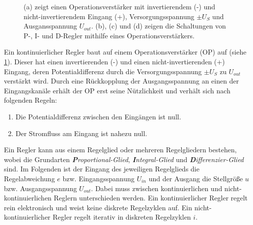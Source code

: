 \begin{figure}[h]
{{{	    	}
	}}
	\caption[Operationsverstärker, Regler]{(a) zeigt einen Operationsverstärker
	mit invertierendem (-) und nicht-invertierendem
	Eingang (+), Versorgungsspannung $\pm U_S$ und
	Ausgansspannung $U_{out}$. (b), (c) und (d) zeigen die Schaltungen von
	P-, I- und D-Regler mithilfe eines
	Operationsverstärkers.}
	\label{fig:operationsverstaerker}
\end{figure}
Ein kontinuierlicher Regler baut auf einem Operationsverstärker (OP) auf (siehe
\ref{fig:operationsverstaerker}). Dieser
hat einen invertierenden (-) und einen nicht-invertierenden (+) Eingang, deren Potentialdifferenz durch die
Versorgungsspannung $\pm U_S$ zu $U_{out}$ verstärkt wird. Durch eine
Rückkopplung der Ausgangsspannung an einen der Eingangskanäle erhält der OP erst
seine Nützlichkeit und verhält sich nach folgenden Regeln:
\begin{enumerate}
       \item Die Potentialdifferenz zwischen den Eingängen ist null.
       \item Der Stromfluss am Eingang ist nahezu null.
\end{enumerate}
Ein Regler kann aus einem Regelglied oder mehreren Regelgliedern bestehen, wobei
die Grundarten \textit{\textbf{P}roportional-Glied}, \textit{\textbf{I}ntegral-Glied} und
\textit{\textbf{D}ifferenzier-Glied} sind. Im Folgenden ist der Eingang des
jeweiligen Regelglieds die Regelabweichung $e$ bzw. Eingangsspannung $U_{in}$
und der Ausgang die Stellgröße $u$ bzw. Ausgangsspannung $U_{out}$. Dabei muss
zwischen kontinuierlichen und nicht-kontinuierlichen Reglern unterschieden
werden. Ein kontinuierlicher Regler regelt rein elektronisch und weist keine
diskrete Regelzyklen auf. Ein nicht-kontinuierlicher Regler regelt iterativ in
diskreten Regelzyklen $i$.


